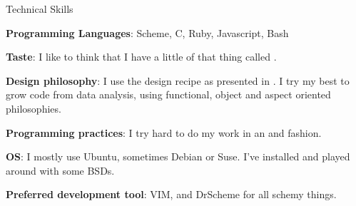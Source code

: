\begin{rubric}{Technical Skills}{ 

    \entry* \textbf{Programming Languages}: Scheme, C, Ruby, Javascript, Bash

    \entry* \textbf{Taste}: I like to think that I have a little of that thing
    called .

    \entry* \textbf{Design philosophy}: I use the design recipe as presented in
    . I try my best to grow code
    from data analysis, using functional, object and aspect oriented
    philosophies. 

    \entry* \textbf{Programming practices}: I try hard to do my work in an
     and 
    fashion.

    \entry* \textbf{OS}: I mostly use Ubuntu, sometimes Debian or Suse. I've
    installed and played around with some BSDs.

    \entry* \textbf{Preferred development tool}: VIM, and DrScheme for all
    schemy things. 

}\end{rubric}
